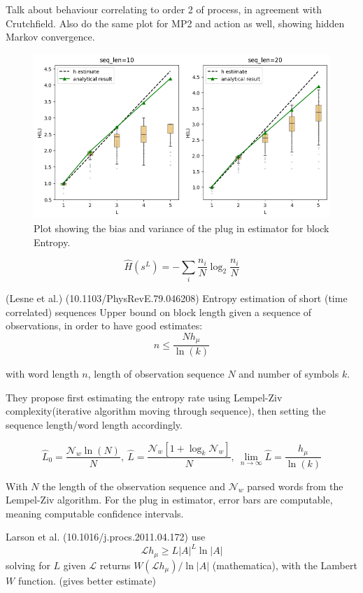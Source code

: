 \documentclass[12pt,a4paper]{article}
\begin{document}
Talk about behaviour correlating to order 2 of process, in agreement with Crutchfield.
Also do the same plot for MP2 and action as well, showing hidden Markov convergence.

\newpage
\begin{figure}[H]
    \centering
    \includegraphics[width=1\linewidth]{../figures/block_entropy_estimation.png}
    \caption{\label{fig:entropy_est} Plot showing the bias and variance of the plug in estimator for block Entropy.}
\end{figure}

$$\hat{H}(s^L) = -\sum_i \frac{n_i}{N} \log_2{\frac{n_i}{N}}$$

(Lesne et al.) (10.1103/PhysRevE.79.046208) Entropy estimation of short (time correlated) sequences
Upper bound on block length given a sequence of observations, in order to have good estimates:
$$ n \leq \frac{N h_\mu}{\ln(k)} $$

with word length $n$, length of observation sequence $N$ and number of symbols $k$.

They propose first estimating the entropy rate using Lempel-Ziv complexity(iterative algorithm moving through sequence), then setting the sequence length/word length accordingly.

$$ \hat{L}_0 = \frac{\mathcal{N}_w \ln(N)}{N},\ \hat{L}=\frac{\mathcal{N}_w[1+\log_k\mathcal{N}_w]}{N},\ \lim_{n \to \infty}\hat{L} = \frac{h_\mu}{\ln(k)} $$

With $N$ the length of the observation sequence and $\mathcal{N}_w$ parsed words from the Lempel-Ziv algorithm.
For the plug in estimator, error bars are computable, meaning computable confidence intervals.

Larson et al. (10.1016/j.procs.2011.04.172) use
$$ \mathcal{L} h_\mu \geq L|A|^L \ln|A| $$
solving for $L$ given $\mathcal{L}$ returns $W(\mathcal{L} h_\mu) / \ln|A|$ (mathematica), with the Lambert $W$ function.
(gives better estimate)
\end{document}
